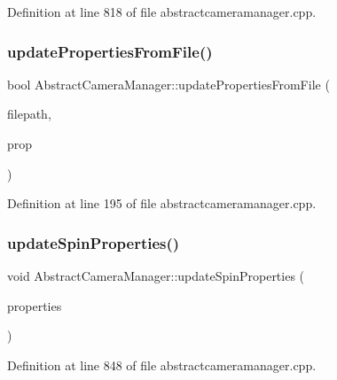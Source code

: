 Definition at line 818 of file abstractcameramanager.\+cpp.

\mbox{\label{class_abstract_camera_manager_aeeb2e0003c8aea5e0816277325ff7b61}} 
\subsubsection{\texorpdfstring{updatePropertiesFromFile()}{updatePropertiesFromFile()}}
{\footnotesize\ttfamily bool Abstract\+Camera\+Manager\+::update\+Properties\+From\+File (\begin{DoxyParamCaption}\item[{Q\+String \&}]{filepath,  }\item[{std\+::vector$<$ \mbox{\hyperlink{class_camera_manager_1_1_camera_property}{Camera\+Property}} $>$ \&}]{prop }\end{DoxyParamCaption})}



Definition at line 195 of file abstractcameramanager.\+cpp.

\mbox{\label{class_abstract_camera_manager_ab4d708f46438adc8cf886c8f5057d1a6}} 
\subsubsection{\texorpdfstring{updateSpinProperties()}{updateSpinProperties()}\hspace{0.1cm}{\footnotesize\ttfamily [1/2]}}
{\footnotesize\ttfamily void Abstract\+Camera\+Manager\+::update\+Spin\+Properties (\begin{DoxyParamCaption}\item[{std\+::vector$<$ \mbox{\hyperlink{class_camera_manager_spin_1_1_spin_camera_property}{Camera\+Manager\+Spin\+::\+Spin\+Camera\+Property}} $>$ \&}]{properties }\end{DoxyParamCaption})}



Definition at line 848 of file abstractcameramanager.\+cpp.

